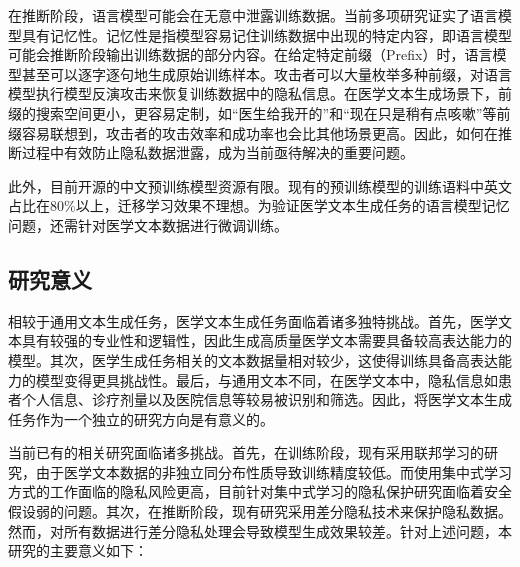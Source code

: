 在推断阶段，语言模型可能会在无意中泄露训练数据。当前多项研究\cite{Extrac_Train_Data_From_LM, RealToxicityPrompts, Counterfactual, LMPPMean}证实了语言模型具有记忆性。记忆性是指模型容易记住训练数据中出现的特定内容，即语言模型可能会推断阶段输出训练数据的部分内容。在给定特定前缀（Prefix）时，语言模型甚至可以逐字逐句地生成原始训练样本。攻击者可以大量枚举多种前缀，对语言模型执行模型反演攻击来恢复训练数据中的隐私信息。在医学文本生成场景下，前缀的搜索空间更小，更容易定制，如“医生给我开的”和“现在只是稍有点咳嗽”等前缀容易联想到，攻击者的攻击效率和成功率也会比其他场景更高。因此，如何在推断过程中有效防止隐私数据泄露，成为当前亟待解决的重要问题。



此外，目前开源的中文预训练模型资源有限。现有的预训练模型\cite{BERT, GPT2}的训练语料中英文占比在80\%以上，迁移学习效果不理想\cite{Transfer_Learning_4LM_Generation, Multi_NMT}。为验证医学文本生成任务的语言模型记忆问题，还需针对医学文本数据进行微调训练。

\subsection{研究意义}

相较于通用文本生成任务，医学文本生成任务面临着诸多独特挑战。首先，医学文本具有较强的专业性和逻辑性，因此生成高质量医学文本需要具备较高表达能力的模型。其次，医学生成任务相关的文本数据量相对较少，这使得训练具备高表达能力的模型变得更具挑战性。最后，与通用文本不同，在医学文本中，隐私信息如患者个人信息、诊疗剂量以及医院信息等较易被识别和筛选。因此，将医学文本生成任务作为一个独立的研究方向是有意义的。

当前已有的相关研究面临诸多挑战。首先，在训练阶段，现有采用联邦学习的研究，由于医学文本数据的非独立同分布性质导致训练精度较低\cite{CC_FL, FL_Medical_Relation_Extraction, FL_CMF}。而使用集中式学习方式的工作面临的隐私风险更高，目前针对集中式学习的隐私保护研究面临着安全假设弱的问题\cite{SecureNLP, SecureNN, secgnn, Cryptflow}。其次，在推断阶段，现有研究采用差分隐私技术\cite{DP}来保护隐私数据。然而，对所有数据进行差分隐私处理会导致模型生成效果较差\cite{DP_Text_Analytics}。针对上述问题，本研究的主要意义如下：


